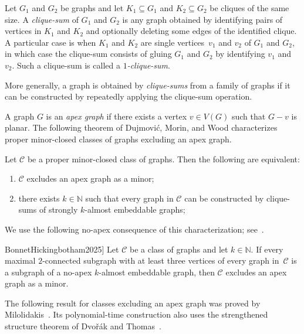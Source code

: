 \documentclass[1p,number,11pt]{elsarticle}
\theoremstyle{plain}
\newcommand{\Cc}{\mathscr{C}}
\begin{document}
Let $G_1$ and $G_2$ be graphs and let $K_1\subseteq G_1$ and $K_2\subseteq G_2$ be cliques of the same size.
A \emph{clique-sum} of $G_1$ and $G_2$ is any graph obtained by identifying pairs of vertices in $K_1$ and $K_2$ and optionally deleting some edges of the identified clique. 
A particular case is when $K_1$ and $K_2$ are single vertices~$v_1$ and $v_2$ of $G_1$ and $G_2$, in which case the clique-sum consists of gluing $G_1$ and $G_2$ by identifying $v_1$ and $v_2$. 
Such a clique-sum is called a \emph{$1$-clique-sum}.

More generally, a graph is obtained by \emph{clique-sums} from a family of graphs if it can be constructed by repeatedly applying the clique-sum operation.

A graph $G$ is an \emph{apex graph} if there exists a vertex $v\in V(G)$ such that $G-v$ is planar.
The following theorem of Dujmović, Morin, and Wood characterizes proper minor-closed classes of graphs excluding an apex graph.


\begin{theorem}
\label{thm:dmw}
Let $\Cc$ be a proper minor-closed class of graphs.
Then the following are equivalent:
\begin{enumerate}[nosep]
    \item $\Cc$ excludes an apex graph as a minor;
    \item there exists $k\in \mathbb N$ such that every graph in $\Cc$ can be constructed by clique-sums of strongly $k$-almost embeddable graphs;
\end{enumerate}
\end{theorem}

We use the following no-apex consequence of this characterization; see~\cite[Theorem~2.2]{BonnetHickingbotham2025}.

\begin{corollary}[\cite[Theorem~2.2]{BonnetHickingbotham2025}]
\label{cor:bloc}
Let $\Cc$ be a class of graphs and let $k\in\mathbb N$.
If every maximal $2$-connected subgraph with at least three vertices of every
graph in~$\Cc$ is a subgraph of a no-apex $k$-almost embeddable graph, then
$\Cc$ excludes an apex graph as a minor.
\end{corollary}

The following result for classes excluding an apex graph was proved by
Milolidakis~\cite{MilolidakisThesis}. Its polynomial-time construction
also uses the strengthened structure theorem of Dvo\v{r}\'ak and
Thomas~\cite{dvorak2014list}.
\end{document}
